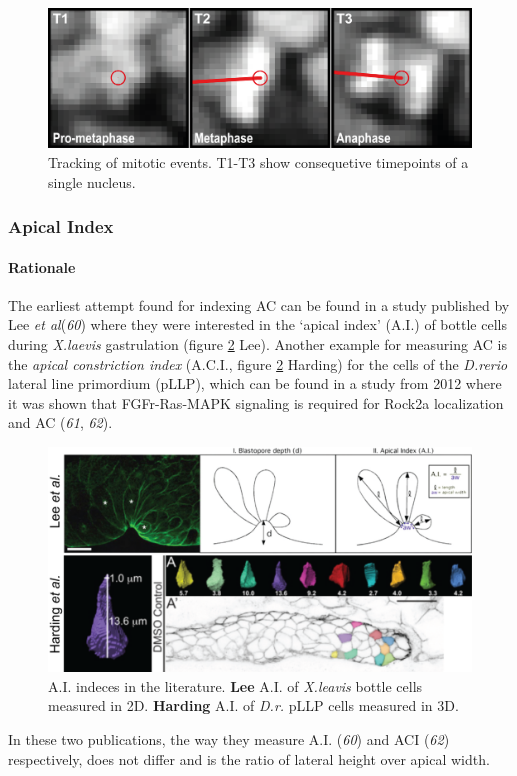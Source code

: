 \documentclass[11pt,singlespacinge,twoside]{reedthesis} %
\theoremstyle{definition}
\theoremstyle{definition}
\theoremstyle{definition}
\theoremstyle{remark}
\begin{document}
\begin{figure}[H]

{\centering \includegraphics[width=0.6\linewidth]{figures/materials/prol/Prolif} 

}

\caption[Tracking of mitotic events]{Tracking of mitotic events. T1-T3 show consequetive timepoints of a single nucleus.}\label{fig:mitodatapoints}
\end{figure}
\hypertarget{ACI}{%
\subsubsection{Apical Index}\label{ACI}}

\hypertarget{rationale}{%
\paragraph{Rationale}\label{rationale}}

The earliest attempt found for indexing AC can be found in a study published by Lee \emph{et al}(\emph{60}) where they were interested in the `apical index' (A.I.) of bottle cells during \emph{X.laevis} gastrulation (figure \ref{fig:ACLee} Lee). Another example for measuring AC is the \emph{apical constriction index} (A.C.I., figure \ref{fig:ACLee} Harding) for the cells of the \emph{D.rerio} lateral line primordium (pLLP), which can be found in a study from 2012 where it was shown that FGFr-Ras-MAPK signaling is required for Rock2a localization and AC (\emph{61}, \emph{62}).


\begin{figure}[H]

{\centering \includegraphics[width=0.75\linewidth]{figures/materials/models/ai} 

}

\caption[A.I. indeces in the literature]{A.I. indeces in the literature. \textbf{Lee} A.I. of \emph{X.leavis} bottle cells measured in 2D. \textbf{Harding} A.I. of \emph{D.r.} pLLP cells measured in 3D.}\label{fig:ACLee}
\end{figure}
\noindent In these two publications, the way they measure A.I. (\emph{60}) and ACI (\emph{62}) respectively, does not differ and is the ratio of lateral height over apical width.
\end{document}
